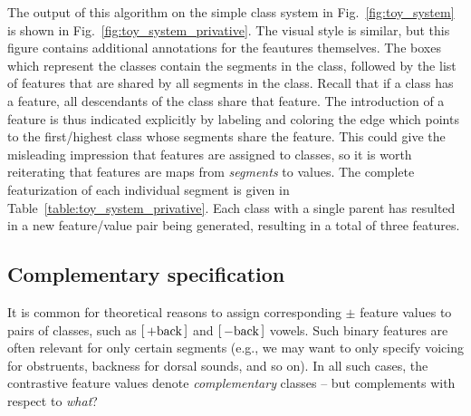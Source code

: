 \documentclass[12pt, oneside]{article}   	%
\newcommand{\featmat}[1]
{$\begin{bsmallmatrix*}[l]\text{\normalsize #1}\end{bsmallmatrix*}$}
\begin{document}
The output of this algorithm on the simple class system in Fig.~\ref{fig:toy_system} is shown in Fig.~\ref{fig:toy_system_privative}. The visual style is similar, but this figure contains additional annotations for the feautures themselves. The boxes which represent the classes contain the segments in the class, followed by the list of features that are shared by all segments in the class. Recall that if a class has a feature, all descendants of the class share that feature. The introduction of a feature is thus indicated explicitly by labeling and coloring the edge which points to the first/highest class whose segments share the feature. This could give the misleading impression that features are assigned to classes, so it is worth reiterating that features are maps from \textit{segments} to values. The complete featurization of each individual segment is given in Table~\ref{table:toy_system_privative}. Each class with a single parent has resulted in a new feature/value pair being generated, resulting in a total of three features.

\FloatBarrier
\subsection{Complementary specification}
\label{sec:contrastiveunder}

It is common for theoretical reasons to assign corresponding $\pm$ feature values to pairs of classes, such as \featmat{+back} and \featmat{$-$back} vowels. Such binary features are often relevant for only certain segments (e.g., we may want to only specify voicing for obstruents, backness for dorsal sounds, and so on). In all such cases, the contrastive feature values denote \textit{complementary} classes -- but complements with respect to \textit{what}?  
\end{document}
